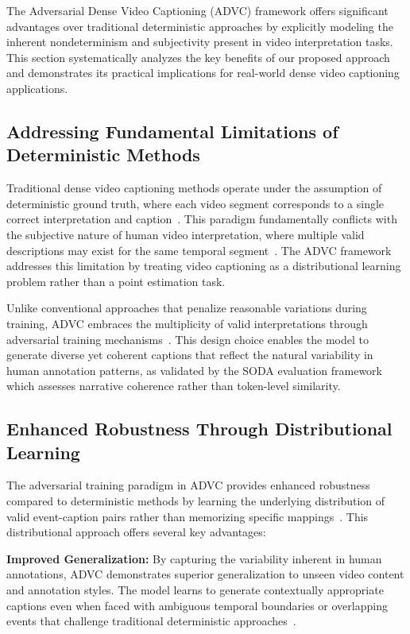 The Adversarial Dense Video Captioning (ADVC) framework offers significant advantages over traditional deterministic approaches by explicitly modeling the inherent nondeterminism and subjectivity present in video interpretation tasks. This section systematically analyzes the key benefits of our proposed approach and demonstrates its practical implications for real-world dense video captioning applications.

\subsection{Addressing Fundamental Limitations of Deterministic Methods}

Traditional dense video captioning methods operate under the assumption of deterministic ground truth, where each video segment corresponds to a single correct interpretation and caption~\cite{Krishna2017-pw,Li2018-ll,Wang2018-ap}. This paradigm fundamentally conflicts with the subjective nature of human video interpretation, where multiple valid descriptions may exist for the same temporal segment~\cite{Summers2021-mz}. The ADVC framework addresses this limitation by treating video captioning as a distributional learning problem rather than a point estimation task.

Unlike conventional approaches that penalize reasonable variations during training, ADVC embraces the multiplicity of valid interpretations through adversarial training mechanisms~\cite{Goodfellow2014-hs}. This design choice enables the model to generate diverse yet coherent captions that reflect the natural variability in human annotation patterns, as validated by the SODA evaluation framework~\cite{Fujita2020-ob} which assesses narrative coherence rather than token-level similarity.

\subsection{Enhanced Robustness Through Distributional Learning}

The adversarial training paradigm in ADVC provides enhanced robustness compared to deterministic methods by learning the underlying distribution of valid event-caption pairs rather than memorizing specific mappings~\cite{Arjovsky2017-qu,Gulrajani2017-dh}. This distributional approach offers several key advantages:

\textbf{Improved Generalization:} By capturing the variability inherent in human annotations, ADVC demonstrates superior generalization to unseen video content and annotation styles. The model learns to generate contextually appropriate captions even when faced with ambiguous temporal boundaries or overlapping events that challenge traditional deterministic approaches~\cite{Duan2018-qf,Chen2021-sv}.

